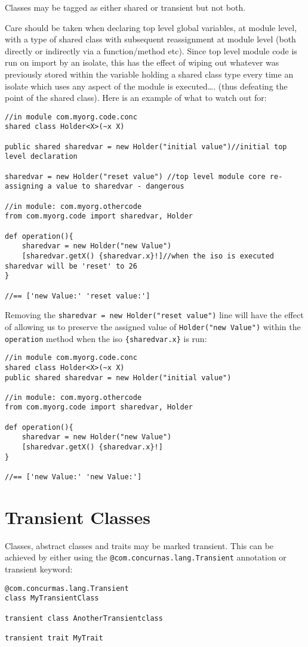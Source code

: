 \documentclass[conc-doc]{subfiles}
\begin{document}
Classes may be tagged as either shared or transient but not both.

Care should be taken when declaring top level global variables, at module level, with a type of shared class with subsequent reassignment at module level (both directly or indirectly via a function/method etc). Since top level module code is run on import by an isolate, this has the effect of wiping out whatever was previously stored within the variable holding a shared class type every time an isolate which uses any aspect of the module is executed…. (thus defeating the point of the shared class). Here is an example of what to watch out for:

\begin{lstlisting}
//in module com.myorg.code.conc
shared class Holder<X>(~x X)

public shared sharedvar = new Holder("initial value")//initial top level declaration

sharedvar = new Holder("reset value") //top level module core re-assigning a value to sharedvar - dangerous

//in module: com.myorg.othercode
from com.myorg.code import sharedvar, Holder

def operation(){
	sharedvar = new Holder("new Value")
	[sharedvar.getX() {sharedvar.x}!]//when the iso is executed sharedvar will be 'reset' to 26
}

//== ['new Value:' 'reset value:']
\end{lstlisting}

Removing the \lstinline{sharedvar = new Holder("reset value")} line will have the effect of allowing us to preserve the assigned value of \lstinline{Holder("new Value")} within the \lstinline{operation} method when the iso \lstinline!{sharedvar.x}! is run:

\begin{lstlisting}
//in module com.myorg.code.conc
shared class Holder<X>(~x X)
public shared sharedvar = new Holder("initial value")

//in module: com.myorg.othercode
from com.myorg.code import sharedvar, Holder

def operation(){
	sharedvar = new Holder("new Value")
	[sharedvar.getX() {sharedvar.x}!]
}

//== ['new Value:' 'new Value:']
\end{lstlisting}


\section{Transient Classes}
\label{sec:transientClasses}
Classes, abstract classes and traits may be marked transient. This can be achieved by either using the \lstinline{@com.concurnas.lang.Transient} annotation or transient keyword:
\begin{lstlisting}
@com.concurmas.lang.Transient
class MyTransientClass

transient class AnotherTransientclass

transient trait MyTrait
\end{lstlisting}
\end{document}
